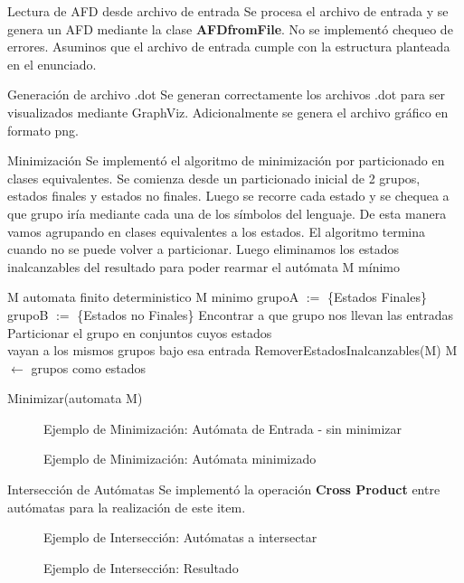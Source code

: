 \documentclass[a4paper,8pt]{article}
\newcommand{\ponerGrafico}[4]
{\begin{figure}[H]
	\centering
	\subfloat{\texttt{[image: \#1]}}
	\caption{#2} \label{fig:#4}
\end{figure}
}
\begin{document}
\begin{subsection}{Lectura de AFD desde archivo de entrada}
Se procesa el archivo de entrada y se genera un AFD mediante la clase \textbf{AFDfromFile}. No se implementó chequeo de errores. Asuminos que el archivo de entrada cumple con la estructura planteada en el enunciado.
\end{subsection}

\begin{subsection}{Generación de archivo .dot}
Se generan correctamente los archivos .dot para ser visualizados mediante GraphViz. Adicionalmente se genera el archivo gráfico en formato png.
\end{subsection}

\begin{subsection}{Minimización}
Se implementó el algoritmo de minimización por particionado en clases equivalentes. Se comienza desde un particionado inicial de 2 grupos, estados finales y estados no finales.
Luego se recorre cada estado y se chequea a que grupo iría mediante cada una de los símbolos del lenguaje.
De esta manera vamos agrupando en clases equivalentes a los estados. 
El algoritmo termina cuando no se puede volver a particionar. 
Luego eliminamos los estados inalcanzables del resultado para poder rearmar el autómata M mínimo

\begin{algorithm}[H]
\begin{algorithmic}[1]
\REQUIRE M automata finito deterministico
\ENSURE M minimo
\STATE grupoA $:=$ \{Estados Finales\}
\STATE grupoB $:=$ \{Estados no Finales\}
\REPEAT 
			\STATE Encontrar a que grupo nos llevan las entradas
				\STATE Particionar el grupo en conjuntos cuyos estados\\ 
						vayan a los mismos grupos bajo esa entrada
			\ENDIF
		\ENDFOR
	\ENDFOR
{}
\STATE RemoverEstadosInalcanzables(M)
\STATE M $\leftarrow$ grupos como estados
\caption{Minimizar(automata M)}
\end{algorithmic}
\end{algorithm}

\ponerGrafico{min_input.png}{Ejemplo de Minimización: Autómata de Entrada - sin minimizar}{0.6}{}
\ponerGrafico{min_final.png}{Ejemplo de Minimización: Autómata minimizado}{0.6}{}

\end{subsection}
\newpage
\begin{subsection}{Intersección de Autómatas}
Se implementó la operación \textbf{Cross Product} entre autómatas para la realización de este item. 

\ponerGrafico{intersectar.png}{Ejemplo de Intersección: Autómatas a intersectar}{0.6}{}
\ponerGrafico{intersectar-res.png}{Ejemplo de Intersección: Resultado}{0.6}{}

\end{subsection}
\end{document}
